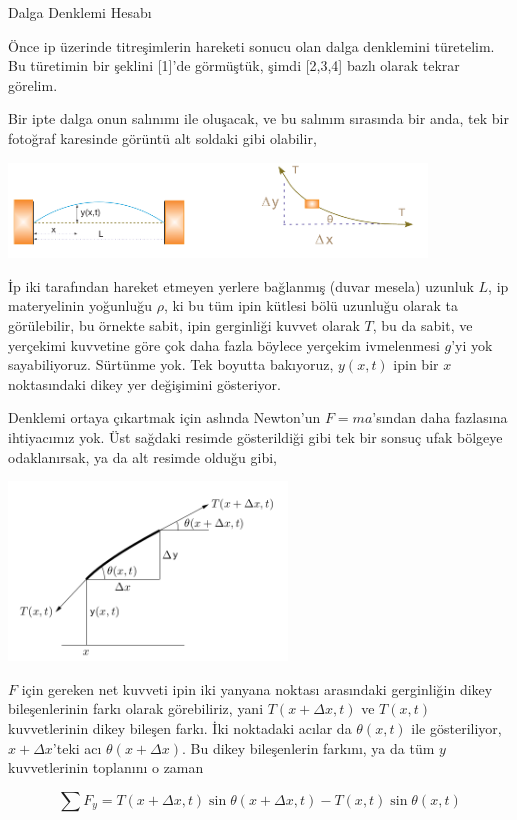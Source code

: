 \documentclass[12pt,fleqn]{article}\usepackage{../../common}
\begin{document}
Dalga Denklemi Hesabı

Önce ip üzerinde titreşimlerin hareketi sonucu olan dalga denklemini
türetelim. Bu türetimin bir şeklini [1]'de görmüştük, şimdi [2,3,4] bazlı olarak
tekrar görelim.

Bir ipte dalga onun salınımı ile oluşacak, ve bu salınım sırasında bir anda, tek
bir fotoğraf karesinde görüntü alt soldaki gibi olabilir, 

\includegraphics[width=30em]{compscieng_app17wave_01.png}

İp iki tarafından hareket etmeyen yerlere bağlanmış (duvar mesela) uzunluk $L$,
ip materyelinin yoğunluğu $\rho$, ki bu tüm ipin kütlesi bölü uzunluğu olarak ta
görülebilir, bu örnekte sabit, ipin gerginliği kuvvet olarak $T$, bu da sabit,
ve yerçekimi kuvvetine göre çok daha fazla böylece yerçekim ivmelenmesi $g$'yi
yok sayabiliyoruz. Sürtünme yok. Tek boyutta bakıyoruz, $y(x,t)$ ipin bir $x$
noktasındaki dikey yer değişimini gösteriyor.

Denklemi ortaya çıkartmak için aslında Newton'un $F=ma$'sından daha fazlasına
ihtiyacımız yok. Üst sağdaki resimde gösterildiği gibi tek bir sonsuç ufak
bölgeye odaklanırsak, ya da alt resimde olduğu gibi,

\includegraphics[width=20em]{compscieng_app17wave_02.png}

$F$ için gereken net kuvveti ipin iki yanyana noktası arasındaki gerginliğin
dikey bileşenlerinin farkı olarak görebiliriz, yani $T(x+\Delta x,t)$ ve
$T(x,t)$ kuvvetlerinin dikey bileşen farkı. İki noktadaki acılar da
$\theta(x,t)$ ile gösteriliyor, $x+\Delta x$'teki acı $\theta(x+\Delta x)$. Bu
dikey bileşenlerin farkını, ya da tüm $y$ kuvvetlerinin toplanını o zaman 

$$
\sum F_y = T(x+\Delta x,t) \sin\theta(x+\Delta x,t) - T(x,t) \sin\theta(x,t)
$$
\end{document}
